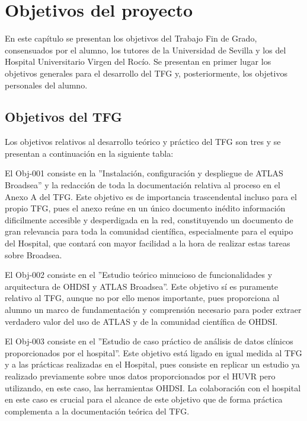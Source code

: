 \chapter{Objetivos del proyecto}\label{cap:02objetivos}

En este capítulo se presentan los objetivos del Trabajo Fin de Grado, consensuados por el alumno, los tutores de la Universidad de Sevilla y los del Hospital Universitario Virgen del Rocío. Se presentan en primer lugar los objetivos generales para el desarrollo del TFG y, posteriormente, los objetivos personales del alumno.

\section{Objetivos del TFG}

Los objetivos relativos al desarrollo teórico y práctico del TFG son tres y se presentan a continuación en la siguiente tabla:



El Obj-001 consiste en la ''Instalación, configuración y despliegue de ATLAS Broadsea'' y la redacción de toda la documentación relativa al proceso en el Anexo A del TFG. Este objetivo es de importancia trascendental incluso para el propio TFG, pues el anexo reúne en un único documento inédito información dificilmente accesible y desperdigada en la red, constituyendo un documento de gran relevancia para toda la comunidad científica, especialmente para el equipo del Hospital, que contará con mayor facilidad a la hora de realizar estas tareas sobre Broadsea.

El Obj-002 consiste en el ''Estudio teórico minucioso de funcionalidades y arquitectura de OHDSI y ATLAS Broadsea''. Este objetivo sí es puramente relativo al TFG, aunque no por ello menos importante, pues proporciona al alumno un marco de fundamentación y comprensión necesario para poder extraer verdadero valor del uso de ATLAS y de la comunidad científica de OHDSI.

El Obj-003 consiste en el ''Estudio de caso práctico de análisis de datos clínicos proporcionados por el hospital''. Este objetivo está ligado en igual medida al TFG y a las prácticas realizadas en el Hospital, pues consiste en replicar un estudio ya realizado previamente sobre unos datos proporcionados por el HUVR pero utilizando, en este caso, las herramientas OHDSI. La colaboración con el hospital en este caso es crucial para el alcance de este objetivo que de forma práctica complementa a la documentación teórica del TFG.



